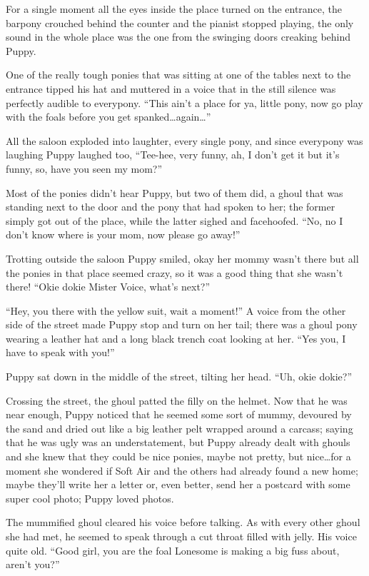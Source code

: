 For a single moment all the eyes inside the place turned on the entrance, the barpony crouched behind the counter and the pianist stopped playing, the only sound in the whole place was the one from the swinging doors creaking behind Puppy.

One of the really tough ponies that was sitting at one of the tables next to the entrance tipped his hat and muttered in a voice that in the still silence was perfectly audible to everypony. ``This ain't a place for ya, little pony, now go play with the foals before you get spanked\dots again\dots''

All the saloon exploded into laughter, every single pony, and since everypony was laughing Puppy laughed too, ``Tee-hee, very funny, ah, I don't get it but it's funny, so, have you seen my mom?''

Most of the ponies didn't hear Puppy, but two of them did, a ghoul that was standing next to the door and the pony that had spoken to her; the former simply got out of the place, while the latter sighed and facehoofed. ``No, no I don't know where is your mom, now please go away!''

Trotting outside the saloon Puppy smiled, okay her mommy wasn't there but all the ponies in that place seemed crazy, so it was a good thing that she wasn't there! ``Okie dokie Mister Voice, what's next?''

``Hey, you there with the yellow suit, wait a moment!'' A voice from the other side of the street made Puppy stop and turn on her tail; there was a ghoul pony wearing a leather hat and a long black trench coat looking at her. ``Yes you, I have to speak with you!''

Puppy sat down in the middle of the street, tilting her head. ``Uh, okie dokie?''

Crossing the street, the ghoul patted the filly on the helmet. Now that he was near enough, Puppy noticed that he seemed some sort of mummy, devoured by the sand and dried out like a big leather pelt wrapped around a carcass; saying that he was ugly was an understatement, but Puppy already dealt with ghouls and she knew that they could be nice ponies, maybe not pretty, but nice\dots for a moment she wondered if Soft Air and the others had already found a new home; maybe they'll write her a letter or, even better, send her a postcard with some super cool photo; Puppy loved photos.

The mummified ghoul cleared his voice before talking. As with every other ghoul she had met, he seemed to speak through a cut throat filled with jelly. His voice quite old. ``Good girl, you are the foal Lonesome is making a big fuss about, aren't you?''

